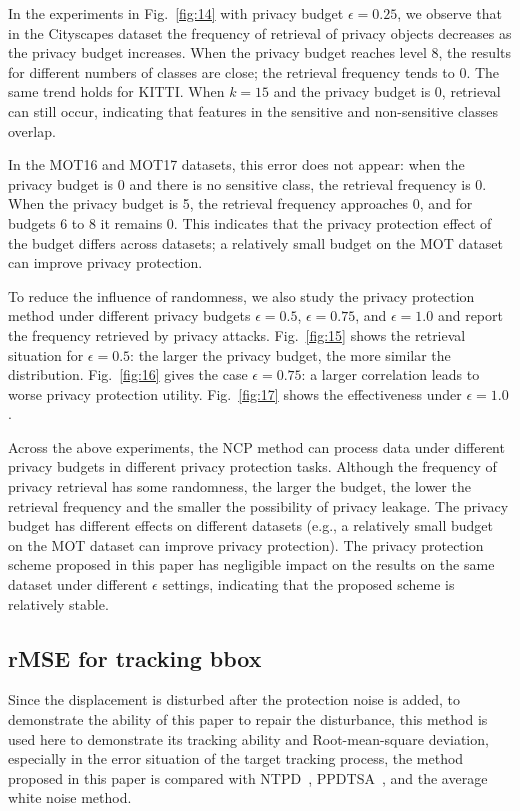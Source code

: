 \documentclass[trans]{IEEEtran}
\begin{document}
In the experiments in Fig.~\ref{fig:14} with privacy budget $\epsilon=0.25$, we observe that in the Cityscapes dataset the frequency of retrieval of privacy objects decreases as the privacy budget increases. When the privacy budget reaches level 8, the results for different numbers of classes are close; the retrieval frequency tends to 0. The same trend holds for KITTI. When $k=15$ and the privacy budget is 0, retrieval can still occur, indicating that features in the sensitive and non-sensitive classes overlap. 

In the MOT16 and MOT17 datasets, this error does not appear: when the privacy budget is 0 and there is no sensitive class, the retrieval frequency is 0. When the privacy budget is 5, the retrieval frequency approaches 0, and for budgets 6 to 8 it remains 0. This indicates that the privacy protection effect of the budget differs across datasets; a relatively small budget on the MOT dataset can improve privacy protection.

To reduce the influence of randomness, we also study the privacy protection method under different privacy budgets $\epsilon=0.5$, $\epsilon=0.75$, and $\epsilon=1.0$ and report the frequency retrieved by privacy attacks. Fig.~\ref{fig:15} shows the retrieval situation for $\epsilon=0.5$: the larger the privacy budget, the more similar the distribution. Fig.~\ref{fig:16} gives the case $\epsilon=0.75$: a larger correlation leads to worse privacy protection utility. Fig.~\ref{fig:17} shows the effectiveness under $\epsilon=1.0$. 

Across the above experiments, the NCP method can process data under different privacy budgets in different privacy protection tasks. Although the frequency of privacy retrieval has some randomness, the larger the budget, the lower the retrieval frequency and the smaller the possibility of privacy leakage. The privacy budget has different effects on different datasets (e.g., a relatively small budget on the MOT dataset can improve privacy protection). The privacy protection scheme proposed in this paper has negligible impact on the results on the same dataset under different $\epsilon$ settings, indicating that the proposed scheme is relatively stable.

\subsection{rMSE for tracking bbox}
Since the displacement is disturbed after the protection noise is added, to demonstrate the ability of this paper to repair the disturbance, this method is used here to demonstrate its tracking ability and Root-mean-square deviation, especially in the error situation of the target tracking process, the method proposed in this paper is compared with NTPD~\cite{zhao2020novel}, PPDTSA~\cite{ma2021ppdtsa}, and the average white noise method. 
\end{document}
